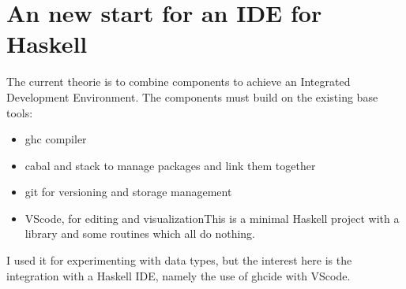 \documentclass[a4paper,10pt]{scrbook}
\providecommand{\tightlist}{%
\setlength{\itemsep}{0pt}\setlength{\parskip}{0pt}}
\begin{document}
\hypertarget{an-new-start-for-an-ide-for-haskell}{%
\section{An new start for an IDE for
Haskell}\label{an-new-start-for-an-ide-for-haskell}}

The current theorie is to combine components to achieve an Integrated
Development Environment. The components must build on the existing base
tools:

\begin{itemize}
\tightlist
\item
  ghc compiler
\item
  cabal and stack to manage packages and link them together
\item
  git for versioning and storage management
\item
  VScode, for editing and visualizationThis is a minimal Haskell project
  with a library and some routines which all do nothing.
\end{itemize}

I used it for experimenting with data types, but the interest here is
the integration with a Haskell IDE, namely the use of ghcide with
VScode.


\printindex
\end{document}
